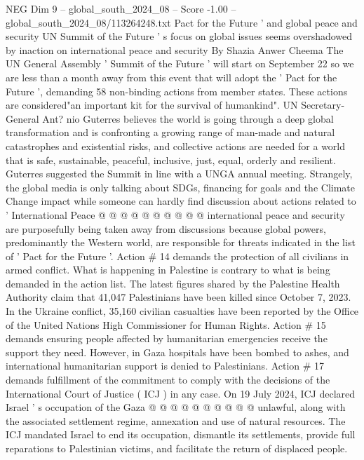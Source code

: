 \begin{textsample}{NEG Dim 9 – global\_south\_2024\_08 – Score -1.00 – global\_south\_2024\_08/113264248.txt}  \label{ex:f9_neg_345}
Pact for the Future ' and global peace and security UN Summit of the Future ' s focus on global issues seems overshadowed by inaction on international peace and security By Shazia Anwer Cheema The UN General Assembly ' Summit of the Future ' will start on September 22 so we are less than a month away from this event that will adopt the ' Pact for the Future ', demanding 58 non-binding actions from member states.
These actions are considered"an important kit for the survival of humankind".
UN Secretary-General Ant? nio Guterres believes the world is going through a deep global transformation and is confronting a growing range of man-made and natural catastrophes and existential risks, and collective actions are needed for a world that is safe, sustainable, peaceful, inclusive, just, equal, orderly and resilient.
Guterres suggested the Summit in line with a UNGA annual meeting.
Strangely, the global media is only talking about SDGs, financing for goals and the Climate Change impact while someone can hardly find discussion about actions related to ' International Peace @ @ @ @ @ @ @ @ @ @ international peace and security are purposefully being taken away from discussions because global powers, predominantly the Western world, are responsible for threats indicated in the list of ' Pact for the Future '.
Action \# 14 demands the protection of all civilians in armed conflict.
What is happening in Palestine is contrary to what is being demanded in the action list.
The latest figures shared by the Palestine Health Authority claim that 41,047 Palestinians have been killed since October 7, 2023.
In the Ukraine conflict, 35,160 civilian casualties have been reported by the Office of the United Nations High Commissioner for Human Rights.
Action \# 15 demands ensuring people affected by humanitarian emergencies receive the support they need.
However, in Gaza hospitals have been bombed to ashes, and international humanitarian support is denied to Palestinians.
Action \# 17 demands fulfillment of the commitment to comply with the decisions of the International Court of Justice ( ICJ ) in any case.
On 19 July 2024, ICJ declared Israel ' s occupation of the Gaza @ @ @ @ @ @ @ @ @ @ unlawful, along with the associated settlement regime, annexation and use of natural resources.
The ICJ mandated Israel to end its occupation, dismantle its settlements, provide full reparations to Palestinian victims, and facilitate the return of displaced people.

\end{textsample}
